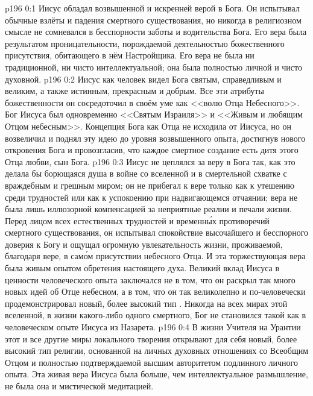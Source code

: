 \author{Промежуточные создания}
\vs p196 0:1 Иисус обладал возвышенной и искренней верой в Бога. Он испытывал обычные взлёты и падения смертного существования, но никогда в религиозном смысле не сомневался в бесспорности заботы и водительства Бога. Его вера была результатом проницательности, порождаемой деятельностью божественного присутствия, обитающего в нём Настройщика. Его вера не была ни традиционной, ни чисто интеллектуальной; она была полностью личной и чисто духовной.
\vs p196 0:2 Иисус как человек видел Бога святым, справедливым и великим, а также истинным, прекрасным и добрым. Все эти атрибуты божественности он сосредоточил в своём уме как <<волю Отца Небесного>>. Бог Иисуса был одновременно <<Святым Израиля>> и <<Живым и любящим Отцом небесным>>. Концепция Бога как Отца не исходила от Иисуса, но он возвеличил и поднял эту идею до уровня возвышенного опыта, достигнув нового откровения Бога и провозгласив, что каждое смертное создание есть дитя этого Отца любви, сын Бога.
\vs p196 0:3 Иисус не цеплялся за веру в Бога так, как это делала бы борющаяся душа в войне со вселенной и в смертельной схватке с враждебным и грешным миром; он не прибегал к вере только как к утешению среди трудностей или как к успокоению при надвигающемся отчаянии; вера не была лишь иллюзорной компенсацией за неприятные реалии и печали жизни. Перед лицом всех естественных трудностей и временн\'ых противоречий смертного существования, он испытывал спокойствие высочайшего и бесспорного доверия к Богу и ощущал огромную увлекательность жизни, проживаемой, благодаря вере, в сам\'ом присутствии небесного Отца. И эта торжествующая вера была живым опытом обретения настоящего духа. Великий вклад Иисуса в ценности человеческого опыта заключался не в том, что он раскрыл так много новых идей об Отце небесном, а в том, что он так великолепно и по\hyp{}человечески продемонстрировал новый, более высокий тип . Никогда на всех мирах этой вселенной, в жизни какого\hyp{}либо одного смертного, Бог не становился такой  как в человеческом опыте Иисуса из Назарета.
\vs p196 0:4 В жизни Учителя на Урантии этот и все другие миры локального творения открывают для себя новый, более высокий тип религии, основанной на личных духовных отношениях со Всеобщим Отцом и полностью подтверждаемой высшим авторитетом подлинного личного опыта. Эта живая вера Иисуса была больше, чем интеллектуальное размышление, не была она и мистической медитацией.

